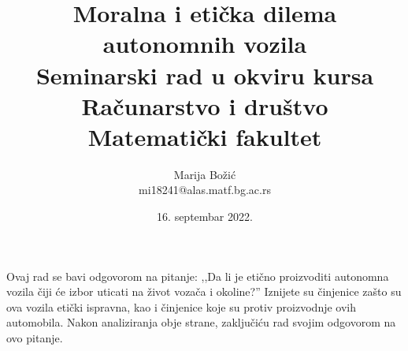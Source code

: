 \documentclass[a4paper]{article}
\begin{document}
\title{Moralna i etička dilema autonomnih vozila\\ \small{Seminarski rad u okviru kursa\\Računarstvo i društvo\\ Matematički fakultet}}



\author{Marija Božić\\mi18241@alas.matf.bg.ac.rs}
\date{16. septembar 2022.}
\maketitle


\abstract Ovaj rad se bavi odgovorom na pitanje: ,,Da li je etično proizvoditi autonomna vozila čiji će izbor uticati na život vozača i okoline?'' Iznijete su činjenice zašto su ova vozila etički ispravna, kao i  činjenice koje su protiv proizvodnje ovih automobila. Nakon analiziranja obje
strane, zaključiću rad svojim odgovorom na ovo pitanje.

\tableofcontents
\newpage
\end{document}
